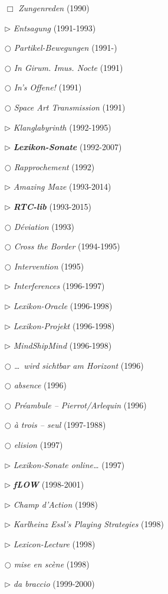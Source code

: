 \documentclass[a4paper,12pt]{article}
\begin{document}
\begin{itemize}
\item[$\Box$] \emph{Zungenreden} (1990)
\item[$\rhd$] \emph{Entsagung} (1991-1993)
\item[$\bigcirc$] \emph{Partikel-Bewegungen} (1991-)
\item[$\bigcirc$] \emph{In Girum. Imus. Nocte} (1991)
\item[$\bigcirc$] \emph{In's Offene!} (1991)
\item[$\bigcirc$] \emph{Space Art Transmission} (1991)
\item[$\rhd$] \emph{Klanglabyrinth} (1992-1995)
\item[$\rhd$] \textbf{\emph{Lexikon-Sonate}} (1992-2007)
\item[$\bigcirc$] \emph{Rapprochement} (1992)
\item[$\rhd$] \emph{Amazing Maze} (1993-2014)
\item[$\rhd$] \textbf{\emph{RTC-lib}} (1993-2015)
\item[$\bigcirc$] \emph{Déviation} (1993)
\item[$\bigcirc$] \emph{Cross the Border} (1994-1995)
\item[$\bigcirc$] \emph{Intervention} (1995)
\item[$\rhd$] \emph{Interferences} (1996-1997)
\item[$\rhd$] \emph{Lexikon-Oracle} (1996-1998)
\item[$\rhd$] \emph{Lexikon-Projekt} (1996-1998)
\item[$\rhd$] \emph{MindShipMind} (1996-1998)
\item[$\bigcirc$] \emph{\dots~wird sichtbar am Horizont} (1996)
\item[$\bigcirc$] \emph{absence} (1996)
\item[$\bigcirc$] \emph{Préambule – Pierrot/Arlequin} (1996)
\item[$\bigcirc$] \emph{à trois – seul} (1997-1988)
\item[$\bigcirc$] \emph{elision} (1997)
\item[$\rhd$] \emph{Lexikon-Sonate online\dots} (1997)
\item[$\rhd$] \textbf{\emph{fLOW}} (1998-2001)
\item[$\rhd$] \emph{Champ d'Action} (1998)
\item[$\rhd$] \emph{Karlheinz Essl's Playing Strategies} (1998)
\item[$\rhd$] \emph{Lexicon-Lecture} (1998)
\item[$\bigcirc$] \emph{mise en scène} (1998)
\item[$\rhd$] \emph{da braccio} (1999-2000)

\end{itemize}
\end{document}
